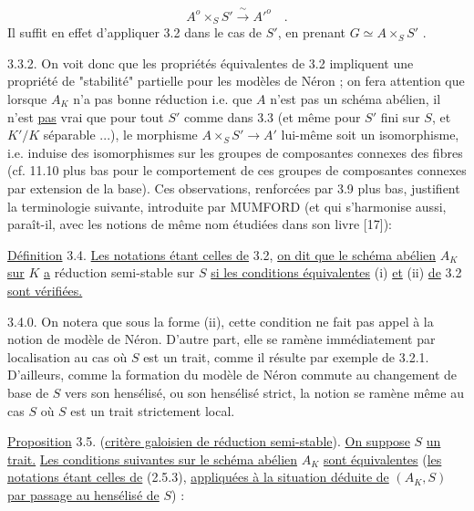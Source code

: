 \begin{equation}\tag{3.3.1}
A^o \times_S S' \xrightarrow{\ \sim\ } {A'}^{o} \quad .
\end{equation}
Il suffit en effet d'appliquer 3.2 dans le cas de $S'$, en prenant $G \simeq A \times_S S'$ .



3.3.2. On voit donc que les propriétés équivalentes de 3.2 impliquent une propriété de "stabilité" partielle pour les modèles de Néron ; on fera attention que lorsque $A_K$ n'a pas bonne réduction i.e. que $A$ n'est pas un schéma abélien, il n'est \underline{pas} vrai que pour tout $S'$ comme dans 3.3 (et même pour $S'$ fini sur $S$, et $K'/K$ séparable ...), le morphisme $A \times_S S' \longrightarrow A'$ lui-même soit un isomorphisme, i.e. induise des isomorphismes sur les groupes de composantes connexes des fibres (cf. 11.10 plus bas pour le comportement de ces groupes de composantes connexes par extension de la base). Ces observations, renforcées par 3.9 plus bas, justifient la terminologie suivante, introduite par MUMFORD (et qui s'harmonise aussi, paraît-il, avec les notions de même nom étudiées dans son livre [17]):

\underline{Définition} 3.4. \underline{Les notations étant celles de} 3.2, \underline{on dit que le schéma abélien} $A_K$ \underline{sur} $K$ \underline{a} réduction semi-stable sur $S$ \underline{si les conditions équivalentes} (i) \underline{et} (ii) \underline{de} 3.2 \underline{sont vérifiées.}

3.4.0. On notera que sous la forme (ii), cette condition ne fait pas appel à la notion de modèle de Néron. D'autre part, elle se ramène immédiatement par localisation au cas où $S$ est un trait, comme il résulte par exemple de 3.2.1. D'ailleurs, comme la formation du modèle de Néron commute au changement de base de $S$ vers son hensélisé, ou son hensélisé strict, la notion se ramène même au cas $S$ où $S$ est un trait strictement local.



\underline{Proposition} 3.5. (\underline{critère galoisien de réduction semi-stable}). \underline{On suppose} $S$ \underline{un trait.} \underline{Les conditions suivantes sur le schéma abélien} $A_K$ \underline{sont équivalentes} (\underline{les notations étant celles de} (2.5.3), \underline{appliquées à la situation déduite de} $(A_K,S)$ \underline{par passage au hensélisé de} $S$) :

